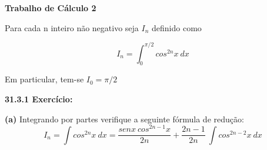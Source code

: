 \documentclass{article}
\begin{document}
\textbf{Trabalho de Cálculo 2}

Para cada n inteiro não negativo seja \(I_n\) definido como

\[I_n = \int_{0}^{\pi/2} cos^{2n}x \ dx\]

Em particular, tem-se \(I_0 = \pi/2\)

\textbf{31.3.1 Exercício:}

\textbf{(a)} Integrando por partes verifique a seguinte fórmula de redução:
\[I_n = \int cos^{2n}x \ dx = \frac{senx \ cos^{2n-1}x}{2n} + \frac{2n-1}{2n} \ \int cos^{2n-2}x \ dx\]
\end{document}
